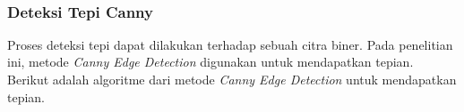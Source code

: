 \begin{adjustbox}{width=1\textwidth}
	\noindent\begin{minipage}{\linewidth}
		\label{fig:MatriksCitraGrayscale}
	\end{minipage}
\end{adjustbox} \\

\subsubsection{Deteksi Tepi Canny}
\noindent Proses deteksi tepi dapat dilakukan terhadap sebuah citra biner. Pada penelitian ini, metode \textit{Canny Edge Detection} digunakan untuk mendapatkan tepian. Berikut adalah algoritme dari metode \textit{Canny Edge Detection} untuk mendapatkan tepian.

